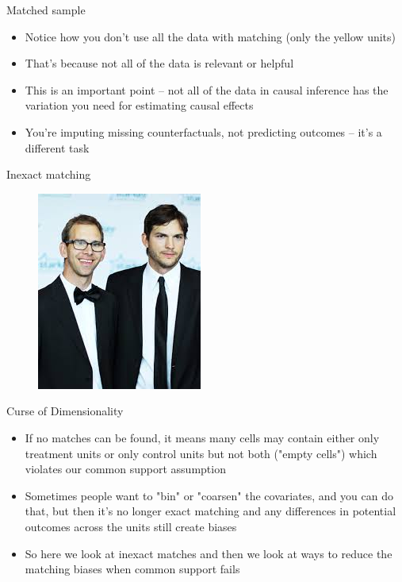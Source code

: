 \documentclass{beamer}
\begin{document}
\begin{frame}{Matched sample}

\begin{itemize}
\item Notice how you don't use all the data with matching (only the yellow units)
\item That's because not all of the data is relevant or helpful
\item This is an important point -- not all of the data in causal inference has the variation you need for estimating causal effects
\item You're imputing missing counterfactuals, not predicting outcomes -- it's a different task
\end{itemize}

\end{frame}




\begin{frame}{Inexact matching}

\begin{figure}[!t]\centering
\includegraphics[scale=0.75]{./lecture_includes/fraternal_twins}
\end{figure}

\end{frame}


\begin{frame}{Curse of Dimensionality}
	
	\begin{itemize}
	\item If no matches can be found, it means many cells may contain either only treatment units or only control units but not both ("empty cells") which violates our common support assumption
	\item Sometimes people want to "bin" or "coarsen" the covariates, and you can do that, but then it's no longer exact matching and any differences in potential outcomes across the units still create biases
	\item So here we look at inexact matches and then we look at ways to reduce the matching biases when common support fails
	\end{itemize}
\end{frame}	
\end{document}
